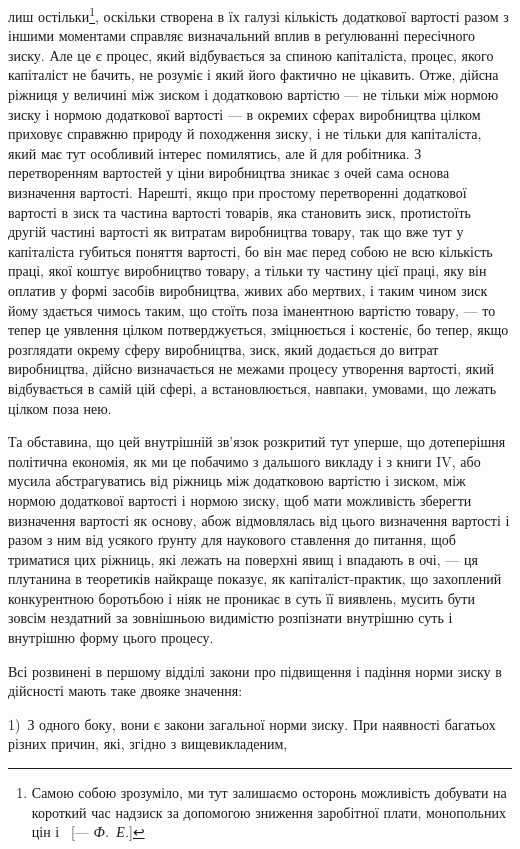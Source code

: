 \parcont{}  %
лиш остільки\footnote{
Самою собою зрозуміло, ми тут залишаємо осторонь можливість добувати
на короткий час надзиск за допомогою зниження заробітної плати, монопольних
цін і~ [— \emph{Ф.~Е.}]
}, оскільки створена в їх галузі кількість додаткової вартості разом з іншими моментами
справляє визначальний вплив в реґулюванні пересічного зиску. Але це є процес, який відбувається за
спиною капіталіста, процес, якого капіталіст
не бачить, не розуміє і який його фактично не цікавить. Отже,
дійсна ріжниця у величині між зиском і додатковою вартістю — не тільки між нормою зиску і нормою
додаткової вартості — в окремих сферах виробництва цілком приховує справжню природу й походження
зиску, і не тільки для капіталіста, який має
тут особливий інтерес помилятись, але й для робітника. З перетворенням вартостей у ціни виробництва
зникає з очей сама
основа визначення вартості. Нарешті, якщо при простому перетворенні додаткової вартості в зиск та
частина вартості товарів, яка становить зиск, протистоїть другій частині вартості як
витратам виробництва товару, так що вже тут у капіталіста
губиться поняття вартості, бо він має перед собою не всю кількість праці, якої коштує виробництво
товару, а тільки ту частину
цієї праці, яку він оплатив у формі засобів виробництва, живих
або мертвих, і таким чином зиск йому здається чимось таким,
що стоїть поза іманентною вартістю товару, — то тепер це
уявлення цілком потверджується, зміцнюється і костеніє, бо
тепер, якщо розглядати окрему сферу виробництва, зиск, який
додається до витрат виробництва, дійсно визначається не межами процесу утворення вартості, який
відбувається в самій
цій сфері, а встановлюється, навпаки, умовами, що лежать цілком поза нею.

Та обставина, що цей внутрішній зв’язок розкритий тут
уперше, що дотеперішня політична економія, як ми це побачимо
з дальшого викладу і з книги IV, або мусила абстрагуватись
від ріжниць між додатковою вартістю і зиском, між нормою
додаткової вартості і нормою зиску, щоб мати можливість зберегти визначення вартості як основу, абож
відмовлялась від
цього визначення вартості і разом з ним від усякого ґрунту
для наукового ставлення до питання, щоб триматися цих ріжниць, які лежать на поверхні явищ і
впадають в очі, — ця плутанина в теоретиків найкраще показує, як капіталіст-практик, що
захоплений конкурентною боротьбою і ніяк не проникає в суть
її виявлень, мусить бути зовсім нездатний за зовнішньою видимістю розпізнати внутрішню суть і
внутрішню форму цього процесу.

Всі розвинені в першому відділі закони про підвищення
і падіння норми зиску в дійсності мають таке двояке значення:

1)~З одного боку, вони є закони загальної норми зиску. При
наявності багатьох різних причин, які, згідно з вищевикладеним,
\parbreak{}  %
